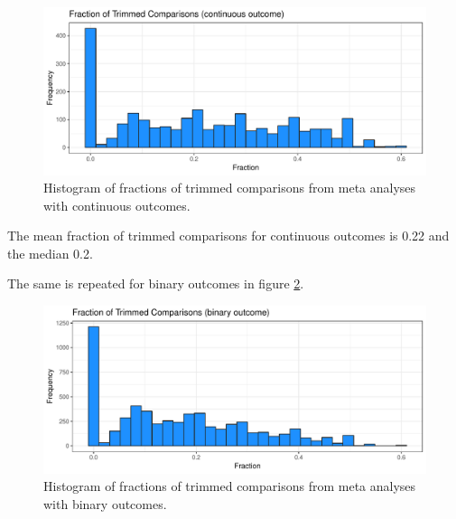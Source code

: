 \documentclass[11pt,a4paper,twoside]{book}\usepackage[]{graphicx}\usepackage[]{color}
\newenvironment{knitrout}{}{} %
\begin{document}
\begin{figure}
\begin{knitrout}
\color{fgcolor}

{\centering \includegraphics[width=\textwidth-3cm]{figure/ch02_figunnamed-chunk-25-1} 

}



\end{knitrout}
\caption{Histogram of fractions of trimmed comparisons from meta analyses with continuous outcomes.}
\label{trimfill.cont}
\end{figure}

The mean fraction of trimmed comparisons for continuous outcomes is 0.22 and the median 0.2.

The same is repeated for binary outcomes in figure \ref{trimfill.bin}. 
\begin{figure}
\begin{knitrout}
\color{fgcolor}

{\centering \includegraphics[width=\textwidth-3cm]{figure/ch02_figunnamed-chunk-26-1} 

}



\end{knitrout}
\caption{Histogram of fractions of trimmed comparisons from meta analyses with binary outcomes.}
\label{trimfill.bin}
\end{figure}
\end{document}
